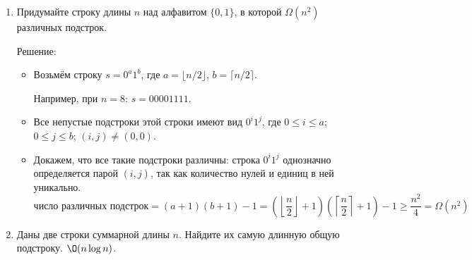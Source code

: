 \begin{enumerate}
\begin{enumerate}
\begin{itemize}
        \item Выберем произвольный $x_{k+1} \in X$, отличный от $x_1, \ldots, x_k$ 
        (это возможно, так как $|X| \geq k + 1$, иначе $(k+1)$-независимость не имела бы смысла).
        
        Разобьём событие $\bigwedge_{i=1}^{k} h(x_i) = y_i$ по всем возможным значениям $h(x_{k+1})$:

        $$\Prb{h}\left[ \bigwedge_{i=1}^{k} h(x_i) = y_i \right] = \sum_{y \in Y} \Prb{h}\left[ \bigwedge_{i=1}^{k} h(x_i) = y_i \;\wedge\; h(x_{k+1}) = y \right] =$$

        \item Применим $(k+1)$-независимость:
        $$= \sum_{y \in Y} \frac{1}{|Y|^{k+1}} = |Y| \cdot \frac{1}{|Y|^{k+1}} = \frac{1}{|Y|^k}$$

        \item Получили определение $k$-независимости.
      \end{itemize}

    \end{enumerate}

  \item
    Придумайте строку длины $n$ над алфавитом $\{0, 1\}$, в которой $\Omega(n^2)$ различных подстрок.

    Решение:

    \begin{itemize}
      \item Возьмём строку $s = 0^a 1^b$, где $a = \lfloor n/2 \rfloor$, $b = \lceil n/2 \rceil$.

      Например, при $n = 8$: $s = 00001111$.

      \item Все непустые подстроки этой строки имеют вид $0^i 1^j$, где $0 \leq i \leq a$; $0 \leq j \leq b$; $(i, j) \neq (0, 0)$.

      \item Докажем, что все такие подстроки различны: строка $0^i 1^j$ однозначно определяется парой $(i, j)$,
      так как количество нулей и единиц в ней уникально.
      $$\text{число различных подстрок} = (a + 1)(b + 1) - 1 = \left(\left\lfloor \frac{n}{2} \right\rfloor + 1\right)\left(\left\lceil \frac{n}{2} \right\rceil + 1\right) - 1 \geq \frac{n^2}{4} = \Omega(n^2)$$

    \end{itemize}

  \item
    Даны две строки суммарной длины $n$. Найдите их самую длинную общую подстроку. $\O(n \log n)$.


\end{enumerate}
